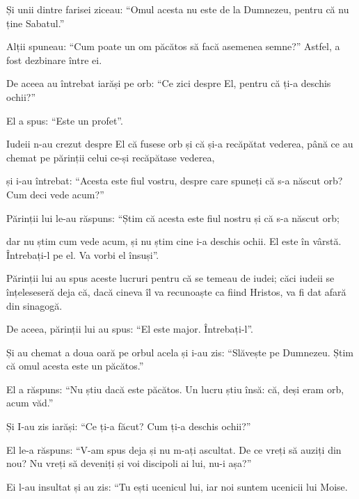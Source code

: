 {\par }{\PP {}Și unii dintre farisei ziceau: “Omul acesta nu este de la Dumnezeu, pentru că nu ține Sabatul.”

\par }{\PP Alții spuneau: “Cum poate un om păcătos să facă asemenea semne?” Astfel, a fost dezbinare între ei.


\par }{\PP {}De aceea au întrebat iarăși pe orb: “Ce zici despre El, pentru că ți-a deschis ochii?”

\par }{\PP El a spus: “Este un profet”.


\par }{\PP {}Iudeii n-au crezut despre El că fusese orb și că și-a recăpătat vederea, până ce au chemat pe părinții celui ce-și recăpătase vederea,

și i-au întrebat: “Acesta este fiul vostru, despre care spuneți că s-a născut orb? Cum deci vede acum?”


\par }{\PP {}Părinții lui le-au răspuns: “Știm că acesta este fiul nostru și că s-a născut orb;

dar nu știm cum vede acum, și nu știm cine i-a deschis ochii. El este în vârstă. Întrebați-l pe el. Va vorbi el însuși”.

Părinții lui au spus aceste lucruri pentru că se temeau de iudei; căci iudeii se înțeleseseră deja că, dacă cineva îl va recunoaște ca fiind Hristos, va fi dat afară din sinagogă.

De aceea, părinții lui au spus: “El este major. Întrebați-l”.


\par }{\PP {}Și au chemat a doua oară pe orbul acela și i-au zis: “Slăvește pe Dumnezeu. Știm că omul acesta este un păcătos.”


\par }{\PP {}El a răspuns: “Nu știu dacă este păcătos. Un lucru știu însă: că, deși eram orb, acum văd.”


\par }{\PP {}Și I-au zis iarăși: “Ce ți-a făcut? Cum ți-a deschis ochii?”


\par }{\PP {}El le-a răspuns: “V-am spus deja și nu m-ați ascultat. De ce vreți să auziți din nou? Nu vreți să deveniți și voi discipoli ai lui, nu-i așa?”


\par }{\PP {}Ei l-au insultat și au zis: “Tu ești ucenicul lui, iar noi suntem ucenicii lui Moise.

}
